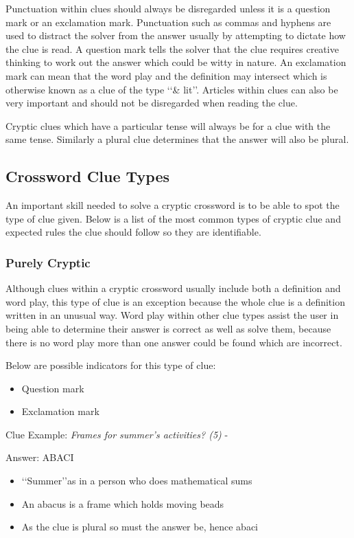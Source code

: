 Punctuation within clues should always be disregarded unless it is a question mark or an exclamation mark. Punctuation such as commas and hyphens are used to distract the solver from the answer usually by attempting to dictate how the clue is read. A question mark tells the solver that the clue requires creative thinking to work out the answer which could be witty in nature. An exclamation mark can mean that the word play and the definition may intersect which is otherwise known as a clue of the type \lq\lq \& lit\rq\rq. Articles within clues can also be very important and should not be disregarded when reading the clue.

Cryptic clues which have a particular tense will always be for a clue with the same tense. Similarly a plural clue determines that the answer will also be plural.

\subsection{Crossword Clue Types}
An important skill needed to solve a cryptic crossword is to be able to spot the type of clue given. Below is a list of the most common types of cryptic clue and expected rules the clue should follow so they are identifiable. 

\subsubsection{Purely Cryptic}
Although clues within a cryptic crossword usually include both a definition and word play, this type of clue is an exception because the whole clue is a definition written in an unusual way. Word play within other clue types assist the user in being able to determine their answer is correct as well as solve them, because there is no word play more than one answer could be found which are incorrect.  

Below are possible indicators for this type of clue:
\begin{itemize} 
	\item Question mark 
	\item Exclamation mark
\\
\end{itemize} 

Clue Example: \emph{Frames for summer's activities? (5)} - \citep{shuchiCryptic08}

Answer: ABACI 

\begin{itemize}
	\item \lq\lq Summer\rq\rq as in a person who does mathematical sums 
	\item An abacus is a frame which holds moving beads 
	\item As the clue is plural so must the answer be, hence abaci
\end{itemize}

